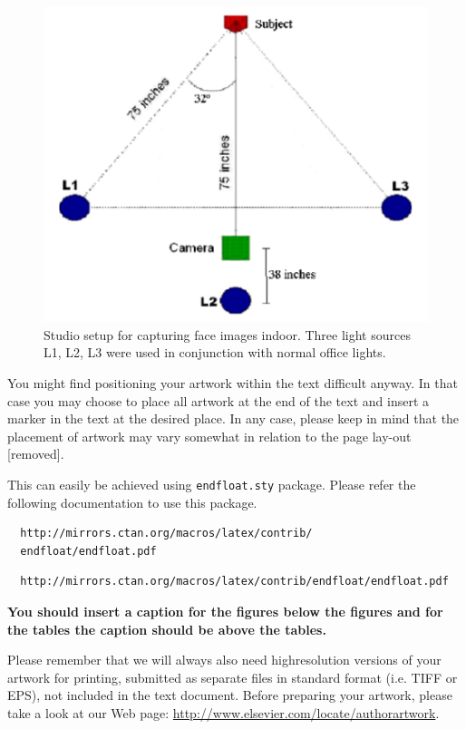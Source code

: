 \documentclass[times,twocolumn,final]{elsarticle}
\begin{document}
\begin{figure}[!t]
\centering
\includegraphics[scale=.5]{medimafig01}
\caption{Studio setup for capturing face images indoor. Three light
sources L1, L2, L3 were used in conjunction with normal office lights.}
\end{figure}

You might find positioning your artwork within the text difficult
anyway. In that case you may choose to place all artwork at the end of
the text and insert a marker in the text at the desired place. In any
case, please keep in mind that the placement of artwork may vary
somewhat in relation to the page lay-out [removed].

This can easily be achieved using \verb+endfloat.sty+ package. Please
refer the following documentation to use this package.
\makeatletter
\if@twocolumn
\begin{verbatim}
  http://mirrors.ctan.org/macros/latex/contrib/
  endfloat/endfloat.pdf
\end{verbatim}
\else
\begin{verbatim}
  http://mirrors.ctan.org/macros/latex/contrib/endfloat/endfloat.pdf
\end{verbatim}
\fi
\makeatother

\textcolor{newcolor}{\bf You should insert a caption for the figures
below the figures and for the tables the caption should be above the
tables.} 

Please remember that we will always also need highresolution versions
of your artwork for printing, submitted as separate files in standard
format (i.e. TIFF or EPS), not included in the text document. Before
preparing your artwork, please take a look at our Web page:
\url{http://www.elsevier.com/locate/authorartwork}.
\end{document}
